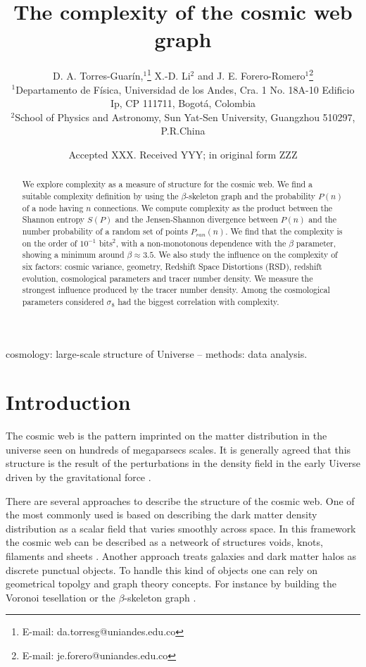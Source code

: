 \documentclass[fleqn,usenatbib]{mnras}
\title[Cosmic Web Graph Complexity]{The complexity of the cosmic web graph}
\author[Torres-Guar\'in et al.]{
D. A. Torres-Guar\'in,$^{1}$\thanks{E-mail:
  da.torresg@uniandes.edu.co} 
X.-D. Li$^{2}$
and J. E. Forero-Romero$^{1}$\thanks{E-mail:
  je.forero@uniandes.edu.co} 
\\
$^{1}$Departamento de F\'isica, Universidad de los Andes, Cra. 1
No. 18A-10 Edificio Ip, CP 111711, Bogot\'a, Colombia\\ 
$^{2}$School of Physics and Astronomy, Sun Yat-Sen University,
Guangzhou 510297, P.R.China\\ 
}
\date{Accepted XXX. Received YYY; in original form ZZZ}
\begin{document}
\label{firstpage}
\pagerange{\pageref{firstpage}--\pageref{lastpage}}
\maketitle

\begin{abstract}
We explore complexity as a measure of structure for the cosmic web. 
We find a suitable complexity definition by using the $\beta$-skeleton graph and
the probability $P(n)$ of a node having $n$ connections. 
We compute complexity as the product between the Shannon entropy
$S(P)$ and the Jensen-Shannon divergence  between $P(n)$ and the number
probability of a random set of points $P_{ran}(n)$. 
We find that the complexity is on the order of $10^{-1}$ bits$^2$,
with a non-monotonous dependence with the $\beta$ parameter, showing
a minimum around $\beta\approx3.5$.
We also study the influence on the  complexity of six factors:  cosmic
variance, geometry, Redshift Space Distortions (RSD), redshift
evolution, cosmological parameters and tracer number density. 
We measure the strongest influence produced by the tracer number density.
Among the cosmological parameters considered $\sigma_{8}$ had the
biggest correlation with complexity.  

\end{abstract}
\begin{keywords}
cosmology: large-scale structure of Universe -- methods: data analysis.
\end{keywords}


\section{Introduction}
The cosmic web is the pattern imprinted on the matter distribution in the
universe seen on hundreds of  megaparsecs scales. 
It is generally agreed that this structure is the result of the
perturbations in the density field in the early Uiverse
driven by the gravitational force \citep{cosmic_web}. 

There are several approaches to describe the structure of the cosmic
web. 
One of the most commonly used is based on describing the dark matter density 
distribution  as a scalar field that varies smoothly across space.
In this framework the cosmic web can be described as a netweork of structures 
voids, knots, filaments and sheets \citep{2018MNRAS.473.1195L}. 
Another approach treats galaxies and dark matter halos as discrete 
punctual objects.
To handle this kind of objects one can rely on geometrical topolgy 
and graph theory concepts.
For instance by building the Voronoi tesellation \citep{voronoi} or the
$\beta$-skeleton graph \citep{beta_skeleton}.  
\end{document}
